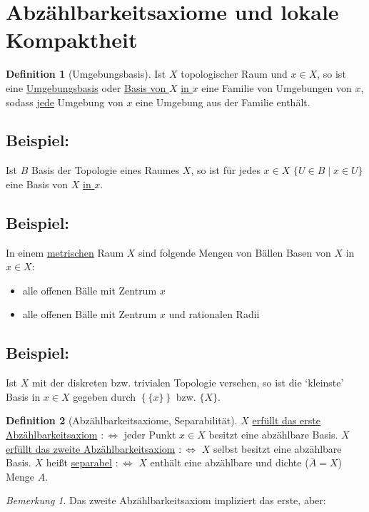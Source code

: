 \documentclass[a4paper,11pt,notitlepage]{report}
\theoremstyle{remark}
\newtheorem{remark}{Bemerkung}[chapter]
\theoremstyle{definition}
\newtheorem{definition}{Definition}[chapter]
\newenvironment{bsp}[1]
{
\setlength{\fboxsep}{10pt}
\subsection*{Beispiel: #1}
\begin{upshape}
}
{
\end{upshape}
}
\begin{document}
\newpage
\section{Abzählbarkeitsaxiome und lokale Kompaktheit}
\begin{definition}[Umgebungsbasis]
	Ist $X$ topologischer Raum und $x \in X$, so ist eine \underline{Umgebungsbasis} oder \underline{Basis von $X$} \underline{\underline{in $x$}} eine Familie von Umgebungen von $x$, sodass \underline{jede} Umgebung von $x$ eine Umgebung aus der Familie enthält.
\end{definition}

\begin{bsp}{}
	Ist $B$ Basis der Topologie eines Raumes $X$, so ist für jedes $x \in X$ $\{U \in B \mid x \in U\}$ eine Basis von $X$ \underline{\underline{in $x$}}.
\end{bsp}

\begin{bsp}{}
	In einem \underline{metrischen} Raum $X$ sind folgende Mengen von Bällen Basen von $X$ in $x \in X$:
	\begin{itemize}
		\item alle offenen Bälle mit Zentrum $x$
		\item alle offenen Bälle mit Zentrum $x$ und rationalen Radii
	\end{itemize}
\end{bsp}

\begin{bsp}{}
	\label{UmgebungsbasisDiskreteTopologie}
	Ist $X$ mit der diskreten bzw. trivialen Topologie versehen, so ist die `kleinste' Basis in $x \in X$ gegeben durch $\left\{\{x\}\right\}$ bzw. $\{X\}$.
\end{bsp}

\begin{definition}[Abzählbarkeitsaxiome, Separabilität]
	$X$ \underline{erfüllt das erste Abzählbarkeitsaxiom}
	$:\Leftrightarrow$ jeder Punkt $x \in X$ besitzt eine abzählbare Basis.
	\newline
	$X$ \underline{erfüllt das zweite Abzählbarkeitsaxiom}
	$:\Leftrightarrow$ $X$ selbst besitzt eine abzählbare Basis.
	\newline
	$X$ heißt \underline{separabel} $:\Leftrightarrow$ $X$ enthält eine abzählbare und dichte ($\bar{A} = X$) Menge $A$.
\end{definition}
 
\begin{remark}
	Das zweite Abzählbarkeitsaxiom impliziert das erste, aber:
\end{remark} 
\end{document}
